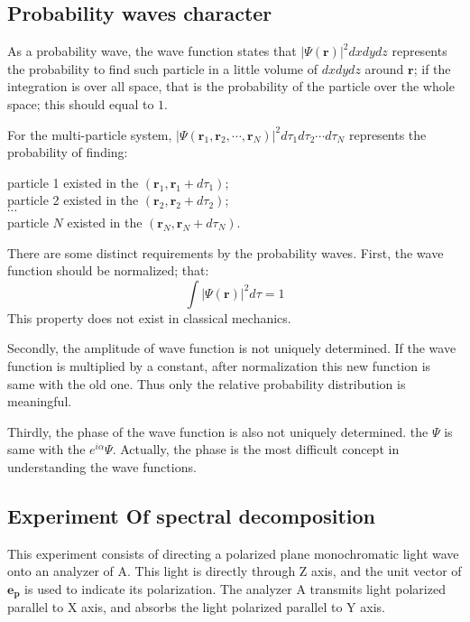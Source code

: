 \subsection{Probability waves character}
\label{sec:PWC_in_basic}
%
%
As a probability wave, the wave function states that $
|\Psi(\bm{r})|^{2} dxdydz$ represents the probability to find such
particle in a little volume of $dxdydz$ around $\bm{r}$; if the
integration is over all space, that is the probability of the particle
over the whole space; this should  equal to $1$.

For the multi-particle system, $ |\Psi(\bm{r}_{1}, \bm{r}_{2}, \cdots,
\bm{r}_{N})|^{2} d\tau_{1}d\tau_{2}\cdots d\tau_{N}$ represents the
probability of finding:
\begin{center}
particle 1 existed in the $(\bm{r}_{1}, \bm{r}_{1}+d\tau_{1})$; \\
particle 2 existed in the $(\bm{r}_{2}, \bm{r}_{2}+d\tau_{2})$; \\
$\cdots$ \\
particle $N$ existed in the $(\bm{r}_{N}, \bm{r}_{N}+d\tau_{N})$.
\end{center}

There are some distinct requirements by the probability waves.
First, the wave function should be normalized; that:
\begin{equation}\label{}
\int |\Psi(\bm{r})|^{2} d\tau = 1
\end{equation}
This property does not exist in classical mechanics.

Secondly, the amplitude of wave function is not uniquely determined.
If the wave function is multiplied by a constant, after
normalization this new function is same with the old one. Thus only
the relative probability distribution is meaningful.

Thirdly, the phase of the wave function is also not uniquely
determined. the $\Psi$ is same with the $e^{i\alpha}\Psi$. Actually,
the phase is the most difficult concept in understanding the wave
functions.

\subsection{Experiment Of spectral decomposition}
%
%
%
%
This experiment consists of directing a polarized plane
monochromatic light wave onto an analyzer of A. This light is
directly through Z axis, and the unit vector of $\bm{e_{p}}$ is used
to indicate its polarization. The analyzer A transmits light
polarized parallel to X axis, and absorbs the light polarized
parallel to Y axis.


